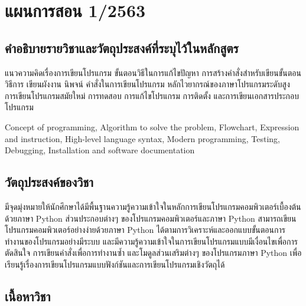 \chapter{แผนการสอน 1/2563}
\section*{คำอธิบายรายวิชาและวัตถุประสงค์ที่ระบุไว้ในหลักสูตร}


\begin{tcolorbox}[breakable,enhanced,fonttitle=\bfseries,colback=myblue!05,colframe=myblue]
แนวความคิดเรื่องการเขียนโปรแกรม ขั้นตอนวิธีในการแก้ไขปัญหา การสร้างคำสั่งสำหรับเขียนขั้นตอนวิธีการ เขียนผังงาน นิพจน์ คำสั่งในการเขียนโปรแกรม หลักไวยากรณ์ของภาษาโปรแกรมระดับสูง การเขียนโปรแกรมสมัยใหม่ การทดสอบ การแก้ไขโปรแกรม การติดตั้ง และการเขียนเอกสารประกอบโปรแกรม

Concept of programming, Algorithm to solve the problem, Flowchart, Expression and instruction, High-level language syntax, Modern programming, Testing, Debugging, Installation and software documentation
\end{tcolorbox}

\section*{วัตถุประสงค์ของวิชา}

\begin{tcolorbox}[breakable,enhanced,fonttitle=\bfseries,colback=myblue!05,colframe=myblue]
มีจุดมุ่งหมายให้นักศึกษาได้มีพื้นฐานความรู้ความเข้าใจในหลักการเขียนโปรแกรมคอมพิวเตอร์เบื้องต้นด้วยภาษา Python ส่วนประกอบต่างๆ ของโปรแกรมคอมพิวเตอร์และภาษา Python สามารถเขียนโปรแกรมคอมพิวเตอร์อย่างง่ายด้วยภาษา Python ได้ตามการวิเคราะห์และออกแบบขั้นตอนการทำงานของโปรแกรมอย่างมีระบบ และมีความรู้ความเข้าใจในการเขียนโปรแกรมแบบมีเงื่อนไขเพื่อการตัดสินใจ การเขียนคำสั่งเพื่อการทำงานซ้ำ และโมดูลส่วนเสริมต่างๆ ของโปรแกรมภาษา Python เพื่อเรียนรู้เรื่องการเขียนโปรแกรมแบบฟังก์ชันและการเขียนโปรแกรมเชิงวัตถุได้
\end{tcolorbox}
\vspace{1.5cm}

\section*{เนื้อหาวิชา}


